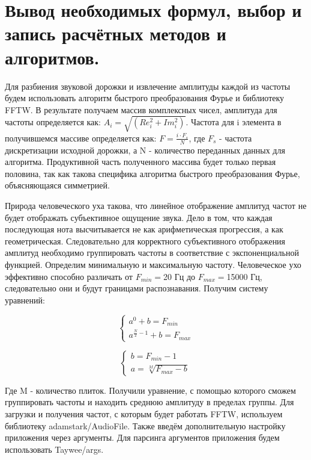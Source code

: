 \documentclass[a4paper,14pt]{extarticle}
\begin{document}
\section{Вывод необходимых формул, выбор и запись расчётных методов и алгоритмов.}
Для разбиения звуковой дорожки и извлечение амплитуды каждой из частоты будем использовать
алгоритм быстрого преобразования Фурье и библиотеку FFTW. В результате получаем массив комплексных чисел, 
амплитуда для частоты определяется как: $A_i = \sqrt{(Re_i^2 + Im_i^2)}$. 
Частота для i элемента в получившемся массиве определяется как: $F = \frac{i \cdot F_s}{N}$,
где $F_s$ - частота дискретизации исходной дорожки, а N - количество переданных данных для алгоритма.
Продуктивной часть полученного массива будет только первая половина, так как такова специфика алгоритма
быстрого преобразования Фурье, объясняющаяся симметрией. 

Природа человеческого уха такова, что линейное отображение амплитуд частот не будет отображать 
субъективное ощущение звука. Дело в том, что каждая последующая нота высчитывается не как арифметическая прогрессия, 
а как геометрическая. Следовательно для корректного субъективного отображения амплитуд
необходимо группировать частоты в соответствие с экспоненциальной функцией. Определим минимальную и максимальную
частоту. Человеческое ухо эффективно способно различать от $F_{min} = $20 Гц до $F_{max} = $15000 Гц, 
следовательно они и будут границами распознавания. Получим систему уравнений:

\begin{equation*}
    \begin{cases}
        a^{0} + b = F_{min}
        \\
        a^{\frac{N}{2} - 1} + b = F_{max}
    \end{cases}
\end{equation*}

\begin{equation*}
    \begin{cases}
        b = F_{min} - 1
        \\
        a = \sqrt[M]{F_{max} - b}
    \end{cases}
\end{equation*}

Где M - количество плиток. Получили уравнение, с помощью которого сможем группировать частоты и находить среднюю амплитуду в пределах группы.
Для загрузки и получения частот, с которым будет работать FFTW, используем библиотеку adamstark/AudioFile. 
Также введём дополнительную настройку приложения через аргументы. Для парсинга аргументов приложения будем использовать Taywee/args.
\end{document}
